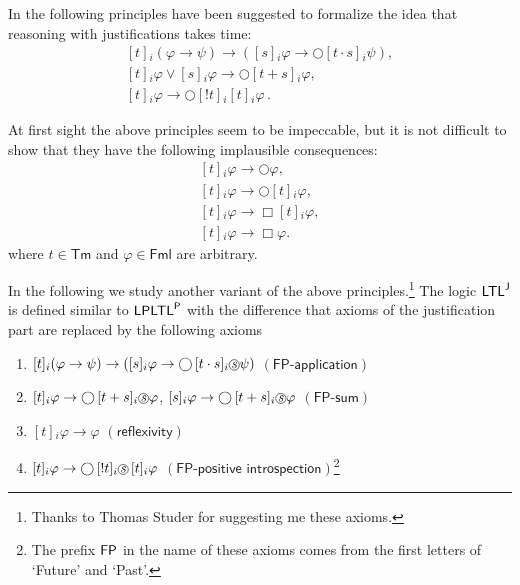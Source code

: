 \documentclass[envcountsect,envcountsame,oribibl,orivec]{llncs}
\newcommand*\circled[1]{\tikz[baseline=(char.base)]{
		\node[shape=circle,draw,inner sep=0.4pt] (char) {#1};}}
\newcommand{\Formulae}{\textsf{Fml}}
\newcommand{\limplies}{\rightarrow}
\newcommand{\lnext}{\bigcirc}
\newcommand{\lalways}{\Box}
\newcommand{\sprevious}{\circled{\textit{s}}}
\newcommand{\LPLTLp}{\textsf{LPLTL}^{\sf P}}
\newcommand{\JLTL}{\textsf{LTL}^{\sf J}}
\newcommand{\Terms}{\textsf{Tm}}
\newcommand{\jbox}[1]{\left[#1\right]\!}
\newcommand{\tapp}{\cdot}
\newcommand{\tinspect}{!}
\newcommand{\refax}{\ensuremath{(\textsf{reflexivity})}}
\newcommand{\fpappax}{\ensuremath{(\textsf{FP-application})}}
\newcommand{\fpsumax}{\ensuremath{(\textsf{FP-sum})}}
\newcommand{\fpposintax}{\ensuremath{(\textsf{FP-positive introspection})}}
\newcommand{\agent}{i}
\newcounter{enumsave}
\renewcommand{\phi}{\varphi}
\begin{document}
In \cite{BucheliGhariStuder2017} the following principles have been suggested to formalize the idea that reasoning with justifications takes time:
%
\begin{gather*}
	\jbox{t}_\agent (\phi \limplies \psi) \limplies (\jbox{s}_\agent \phi \limplies \lnext\jbox{t \tapp s}_\agent \psi), \\
	\jbox{t}_\agent \phi \vee \jbox{s}_\agent \phi \limplies  \lnext \jbox{t + s}_\agent \phi, \\
	\jbox{t}_\agent \phi \limplies \lnext \jbox{\tinspect t}_\agent \jbox{t}_\agent \phi\,.
\end{gather*} 

At first sight the above principles seem to be impeccable, but it is not difficult to show that they have the following implausible consequences:
%
\begin{gather}
	\jbox{t}_\agent \phi \rightarrow \lnext \phi, \label{eq: implausible consequences JLTL 1}
	\\
	\jbox{t}_\agent \phi \rightarrow \lnext\jbox{t}_\agent \phi,
	\\
	\jbox{t}_\agent \phi \rightarrow \lalways \jbox{t}_\agent \phi,
	\\
	\jbox{t}_\agent \phi \rightarrow \lalways \phi. \label{eq: implausible consequences JLTL 4}
\end{gather} 
%
where $t \in \Terms$ and $\phi \in \Formulae$ are arbitrary.

In the following we study another variant of the above principles.\footnote{Thanks to Thomas Studer for suggesting me these axioms.} The logic $\JLTL$ is defined similar to $\LPLTLp$ with the difference that axioms of the justification part are replaced by the following axioms

\begin{enumerate}
	\item $\jbox{t}_\agent (\phi \limplies \psi) \limplies (\jbox{s}_\agent \phi \limplies \lnext\jbox{t \tapp s}_\agent \sprevious\psi)$ \hfill \fpappax
	\item $\jbox{t}_\agent \phi \rightarrow \lnext \jbox{t + s}_\agent \sprevious\phi$, \quad $\jbox{s}_\agent \phi \limplies \lnext \jbox{t + s}_\agent \sprevious\phi$ \hfill \fpsumax
	\item $\jbox{t}_\agent \phi \limplies \phi$ \hfill \refax
	\item $\jbox{t}_\agent \phi \limplies \lnext \jbox{\tinspect t}_\agent \sprevious \jbox{t}_\agent \phi$ \hfill \fpposintax\footnote{The prefix ${\sf FP}$ in the name of these axioms comes from the first letters of `{\sf F}uture' and `{\sf P}ast'.}
\end{enumerate}
\end{document}

